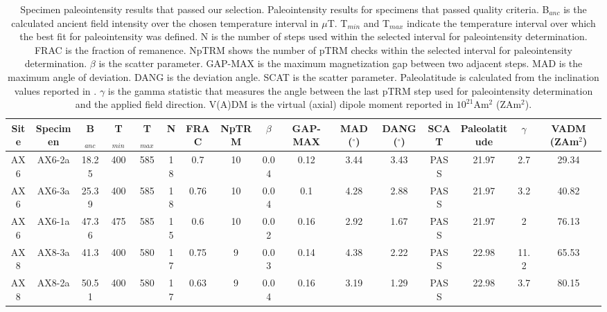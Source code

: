 \documentclass[9pt,twoside,lineno]{pnas-new}
\begin{document}
\begin{table}
\caption{\footnotesize{Specimen paleointensity results that passed our selection. Paleointensity results for specimens that passed quality criteria. B$_{anc}$ is the calculated ancient field intensity over the chosen temperature interval in $\mu$T. T$_{min}$ and T$_{max}$ indicate the temperature interval over which the best fit for paleointensity was defined. N is the number of steps used within the selected interval for paleointensity determination. FRAC is the fraction of remanence. NpTRM shows the number of pTRM checks within the selected interval for paleointensity determination. $\beta$ is the scatter parameter.  GAP-MAX is the maximum magnetization gap between two adjacent steps. MAD is the maximum angle of deviation. DANG is the deviation angle. SCAT is the scatter parameter. Paleolatitude is calculated from the inclination values reported in \cite{Zhang2021b}. $\gamma$ is the gamma statistic that measures the angle between the last pTRM step used for paleointensity determination and the applied field direction. V(A)DM is the virtual (axial) dipole moment reported in $10^{21}$Am$^2$ (ZAm$^2$). }}
\centering
\begin{tabular}{cccccccccccccccc}
\hline
Site & Specimen & B$_{anc}$ & T$_{min}$ & T$_{max}$ & N    & FRAC & NpTRM & $\beta$ & GAP-MAX & MAD ($^\circ$) & DANG ($^\circ$) & SCAT & Paleolatitude & $\gamma$ & VADM (ZAm$^2$) \\
\hline
AX6  & AX6-2a   & 18.25     & 400       & 585       & 18 & 0.7  & 10    & 0.04    & 0.12    & 3.44           & 3.43            & PASS & 21.97         & 2.7      & 29.34         \\
AX6  & AX6-3a   & 25.39     & 400       & 585       & 18 & 0.76 & 10    & 0.04    & 0.1     & 4.28           & 2.88            & PASS & 21.97         & 3.2      & 40.82         \\
AX6  & AX6-1a   & 47.36     & 475       & 585       & 15 & 0.6  & 10    & 0.02    & 0.16    & 2.92           & 1.67            & PASS & 21.97         & 2        & 76.13         \\
AX8  & AX8-3a   & 41.3      & 400       & 580       & 17 & 0.75 & 9     & 0.03    & 0.14    & 4.38           & 2.22            & PASS & 22.98         & 11.2     & 65.53         \\
AX8  & AX8-2a   & 50.51     & 400       & 580       & 17 & 0.63 & 9     & 0.04    & 0.16    & 3.19           & 1.29            & PASS & 22.98         & 3.7      & 80.15         \\

\end{tabular}
\end{table}
\end{document}
